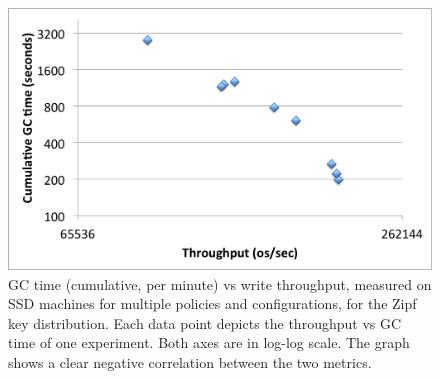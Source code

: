 \begin{figure}[htb]
\includegraphics[width=\figw]{Figs/gc-throughput-log2.png}
\caption{GC time (cumulative, per minute) vs write throughput, measured on SSD machines 
for multiple \sys\/ policies and configurations, for the Zipf  key distribution. Each data point 
depicts the throughput vs GC time of one experiment. Both axes are in log-log scale.  
The graph shows a clear negative correlation between the two metrics. 
}
\label{fig:gc-throughput-log2}
\end{figure}

